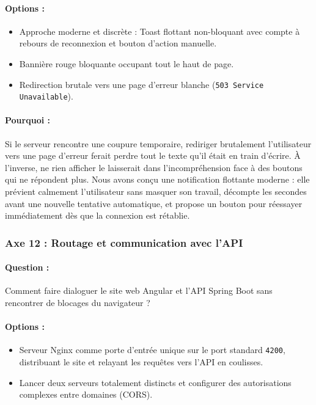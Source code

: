 \documentclass[11pt,a4paper]{article}
\begin{document}
\paragraph{Options :}
\begin{itemize}
    \item[$\boxtimes$] Approche moderne et discrète : Toast flottant non-bloquant avec compte à rebours de reconnexion et bouton d'action manuelle.
    \item[$\square$] Bannière rouge bloquante occupant tout le haut de page.
    \item[$\square$] Redirection brutale vers une page d'erreur blanche (\texttt{503 Service Unavailable}).
\end{itemize}
\paragraph{Pourquoi :} Si le serveur rencontre une coupure temporaire, rediriger brutalement l'utilisateur vers une page d'erreur ferait perdre tout le texte qu'il était en train d'écrire. À l'inverse, ne rien afficher le laisserait dans l'incompréhension face à des boutons qui ne répondent plus. Nous avons conçu une notification flottante moderne : elle prévient calmement l'utilisateur sans masquer son travail, décompte les secondes avant une nouvelle tentative automatique, et propose un bouton pour réessayer immédiatement dès que la connexion est rétablie.

\subsubsection{Axe 12 : Routage et communication avec l'API}
\paragraph{Question :} Comment faire dialoguer le site web Angular et l'API Spring Boot sans rencontrer de blocages du navigateur ?
\paragraph{Options :}
\begin{itemize}
    \item[$\boxtimes$] Serveur Nginx comme porte d'entrée unique sur le port standard \texttt{4200}, distribuant le site et relayant les requêtes vers l'API en coulisses.
    \item[$\square$] Lancer deux serveurs totalement distincts et configurer des autorisations complexes entre domaines (CORS).
\end{itemize}
\end{document}

